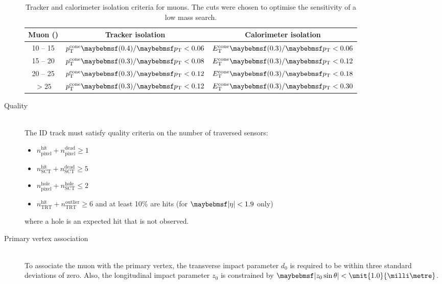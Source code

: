 \begin{description}
	\begin{table}
		\begin{tabular}{c@{\hskip 0.3in}c@{\hskip 0.3in}c}
			Muon \pt (\GeV) & Tracker isolation & Calorimeter isolation \\
			\hline
			10 -- 15 & $p_{\text{T}}^{\text{cone}}\parenths{0.4}/\pt < 0.06$ & $E_{\text{T}}^{\text{cone}}\parenths{0.3}/\pt < 0.06$ \\
			15 -- 20 & $p_{\text{T}}^{\text{cone}}\parenths{0.3}/\pt < 0.08$ & $E_{\text{T}}^{\text{cone}}\parenths{0.3}/\pt < 0.12$ \\
			20 -- 25 & $p_{\text{T}}^{\text{cone}}\parenths{0.3}/\pt < 0.12$ & $E_{\text{T}}^{\text{cone}}\parenths{0.3}/\pt < 0.18$ \\
			$> 25$   & $p_{\text{T}}^{\text{cone}}\parenths{0.3}/\pt < 0.12$ & $E_{\text{T}}^{\text{cone}}\parenths{0.3}/\pt < 0.30$ \\
		\end{tabular}
		\caption{Tracker and calorimeter isolation criteria for muons. The cuts were 
		chosen to optimise the sensitivity of a low mass \HWWlvlv search.}
		\label{tab:objects:mu_iso}
	\end{table}

\item[Quality] \hfill \\
	The \ac{ID} track must satisfy quality criteria on the number of traversed sensors:
	\begin{itemize}[noitemsep,nolistsep]
		\item $n_{\text{pixel}}^{\text{hit}} + n_{\text{pixel}}^{\text{dead}} \geq 1$
		\item $n_{\text{SCT}}^{\text{hit}} + n_{\text{SCT}}^{\text{dead}} \geq 5$
		\item $n_{\text{pixel}}^{\text{hole}} + n_{\text{SCT}}^{\text{hole}} \leq 2$
		\item $n_{\text{TRT}}^{\text{hit}} + n_{\text{TRT}}^{\text{outlier}} \geq 6$ and 
		at least 10\% are hits (for $\mods{\eta} < 1.9$ only)
	\end{itemize}
	where a hole is an expected hit that is not observed.

\item[Primary vertex association] \hfill \\
	To associate the muon with the primary vertex, the transverse impact parameter $d_0$ 
	is required to be within three standard deviations of zero. Also, the longitudinal 
	impact parameter $z_0$ is constrained by $\mods{z_0 \sin\theta} < 
	\unit{1.0}{\milli\metre}$.


\end{description}
